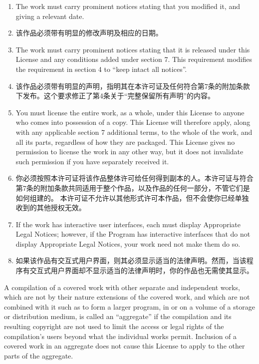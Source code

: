 \documentclass[11pt]{article}
\begin{document}
\begin{enumerate}
        \begin{enumerate}
          \item The work must carry prominent notices stating that you modified
                it, and giving a relevant date.

          \item 该作品必须带有明显的修改声明及相应的日期。

          \item The work must carry prominent notices stating that it is
                released under this License and any conditions added under section
                7.  This requirement modifies the requirement in section 4 to
                ``keep intact all notices''.

          \item 该作品必须带有明显的声明，指明其在本许可证及任何符合第7条的附加条款下发布。这个要求修正了第4条关于“完整保留所有声明”的内容。

          \item You must license the entire work, as a whole, under this
                License to anyone who comes into possession of a copy.  This
                License will therefore apply, along with any applicable section 7
                additional terms, to the whole of the work, and all its parts,
                regardless of how they are packaged.  This License gives no
                permission to license the work in any other way, but it does not
                invalidate such permission if you have separately received it.

          \item 你必须按照本许可证将该作品整体许可给任何得到副本的人。本许可证与符合第7条的附加条款共同适用于整个作品，以及作品的任何一部分，不管它们是如何组建的。
                本许可证不允许以其他形式许可本作品，但不会使你已经单独收到的其他授权无效。

          \item If the work has interactive user interfaces, each must display
                Appropriate Legal Notices; however, if the Program has interactive
                interfaces that do not display Appropriate Legal Notices, your
                work need not make them do so.

          \item 如果该作品有交互式用户界面，则其必须显示适当的法律声明。然而，当该程序有交互式用户界面却不显示适当的法律声明时，你的作品也无需使其显示。

        \end{enumerate}
        A compilation of a covered work with other separate and independent
        works, which are not by their nature extensions of the covered work,
        and which are not combined with it such as to form a larger program,
        in or on a volume of a storage or distribution medium, is called an
        ``aggregate'' if the compilation and its resulting copyright are not
        used to limit the access or legal rights of the compilation's users
        beyond what the individual works permit.  Inclusion of a covered work
        in an aggregate does not cause this License to apply to the other
        parts of the aggregate.


\end{enumerate}
\end{document}
